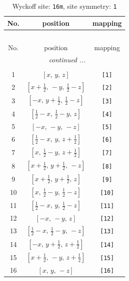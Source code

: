 \documentclass[fleqn,8pt]{jsarticle}
\begin{document}
\begin{longtable}{ccc}
\caption{Wyckoff site: {\tt 16m}, site symmetry: {\tt 1}}
 \\
 \hline \hline
No. & position & mapping \\ \hline \endfirsthead

\multicolumn{2}{l}{\tablename\ \thetable{}} \\
 \hline \hline
No. & position & mapping \\ \hline \endhead

 \hline \hline
\multicolumn{2}{r}{\footnotesize\it continued ...} \\ \endfoot

 \hline \hline
\multicolumn{2}{r}{} \\ \endlastfoot

1 & $\left[ x,\, y,\, z \right]$ & {\tt [1]} \\ \hline
2 & $\left[ x + \frac{1}{2},\, - y,\, \frac{1}{2} - z \right]$ & {\tt [2]} \\ \hline
3 & $\left[ - x,\, y + \frac{1}{2},\, \frac{1}{2} - z \right]$ & {\tt [3]} \\ \hline
4 & $\left[ \frac{1}{2} - x,\, \frac{1}{2} - y,\, z \right]$ & {\tt [4]} \\ \hline
5 & $\left[ - x,\, - y,\, - z \right]$ & {\tt [5]} \\ \hline
6 & $\left[ \frac{1}{2} - x,\, y,\, z + \frac{1}{2} \right]$ & {\tt [6]} \\ \hline
7 & $\left[ x,\, \frac{1}{2} - y,\, z + \frac{1}{2} \right]$ & {\tt [7]} \\ \hline
8 & $\left[ x + \frac{1}{2},\, y + \frac{1}{2},\, - z \right]$ & {\tt [8]} \\ \hline
9 & $\left[ x + \frac{1}{2},\, y + \frac{1}{2},\, z \right]$ & {\tt [9]} \\ \hline
10 & $\left[ x,\, \frac{1}{2} - y,\, \frac{1}{2} - z \right]$ & {\tt [10]} \\ \hline
11 & $\left[ \frac{1}{2} - x,\, y,\, \frac{1}{2} - z \right]$ & {\tt [11]} \\ \hline
12 & $\left[ - x,\, - y,\, z \right]$ & {\tt [12]} \\ \hline
13 & $\left[ \frac{1}{2} - x,\, \frac{1}{2} - y,\, - z \right]$ & {\tt [13]} \\ \hline
14 & $\left[ - x,\, y + \frac{1}{2},\, z + \frac{1}{2} \right]$ & {\tt [14]} \\ \hline
15 & $\left[ x + \frac{1}{2},\, - y,\, z + \frac{1}{2} \right]$ & {\tt [15]} \\ \hline
16 & $\left[ x,\, y,\, - z \right]$ & {\tt [16]} \\
\end{longtable}
\end{document}
